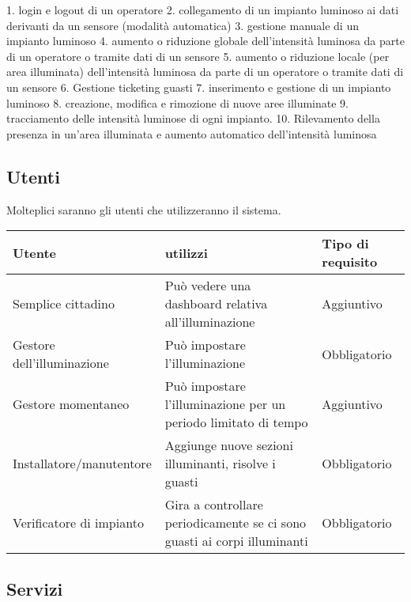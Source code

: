 1. login e logout di un operatore
2. collegamento di un impianto luminoso ai dati derivanti da un sensore (modalità automatica)
3. gestione manuale di un impianto luminoso
4. aumento o riduzione globale dell’intensità luminosa da parte di un operatore o tramite dati di un
sensore
5. aumento o riduzione locale (per area illuminata) dell’intensità luminosa da parte di un operatore o tramite dati di un sensore
6. Gestione ticketing guasti
7. inserimento e gestione di un impianto luminoso
8. creazione, modifica e rimozione di nuove aree illuminate
9. tracciamento delle intensità luminose di ogni impianto.
10. Rilevamento della presenza in un’area illuminata e aumento automatico dell’intensità
luminosa

\subsection{Utenti}

Molteplici saranno gli utenti che utilizzeranno il sistema.

\begin{center}
    \begin{tabularx}{14cm}{|X|X| X|}
        \hline
        Utente & utilizzi & Tipo di requisito\\
        \hline        
        Semplice cittadino& Può vedere una dashboard relativa all'illuminazione &Aggiuntivo\\
        \hline 
        Gestore dell'illuminazione & Può impostare l'illuminazione& Obbligatorio\\
        \hline 
        Gestore momentaneo &Può impostare l'illuminazione per un periodo limitato di tempo & Aggiuntivo\\
        \hline 
        Installatore/manutentore & Aggiunge nuove sezioni illuminanti, risolve i guasti & Obbligatorio \\ 
        \hline 
        Verificatore di impianto&Gira a controllare periodicamente se ci sono guasti ai corpi illuminanti & Obbligatorio\\
        \hline

    \end{tabularx}
\end{center}


\subsection{Servizi}

